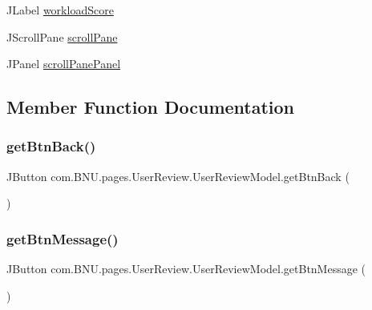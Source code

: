 \begin{DoxyCompactItemize}
\item 
J\+Label \mbox{\hyperlink{classcom_1_1_b_n_u_1_1pages_1_1_user_review_1_1_user_review_model_ab3c079414ba5b6f4f833951fbd028f17}{workload\+Score}}
\item 
J\+Scroll\+Pane \mbox{\hyperlink{classcom_1_1_b_n_u_1_1pages_1_1_user_review_1_1_user_review_model_ac28ee8d9092962f024e60bd57b8f02a5}{scroll\+Pane}}
\item 
J\+Panel \mbox{\hyperlink{classcom_1_1_b_n_u_1_1pages_1_1_user_review_1_1_user_review_model_aa739148e3686221309cc120149f7300d}{scroll\+Pane\+Panel}}
\end{DoxyCompactItemize}


\subsection{Member Function Documentation}
\mbox{\label{classcom_1_1_b_n_u_1_1pages_1_1_user_review_1_1_user_review_model_a686f5cc71adf786ac6cd8d8d5b3a7bb9}} 
\subsubsection{\texorpdfstring{get\+Btn\+Back()}{getBtnBack()}}
{\footnotesize\ttfamily J\+Button com.\+B\+N\+U.\+pages.\+User\+Review.\+User\+Review\+Model.\+get\+Btn\+Back (\begin{DoxyParamCaption}{ }\end{DoxyParamCaption})}

\mbox{\label{classcom_1_1_b_n_u_1_1pages_1_1_user_review_1_1_user_review_model_ab47b5dd798e9c374095e74b0588690fb}} 
\subsubsection{\texorpdfstring{get\+Btn\+Message()}{getBtnMessage()}}
{\footnotesize\ttfamily J\+Button com.\+B\+N\+U.\+pages.\+User\+Review.\+User\+Review\+Model.\+get\+Btn\+Message (\begin{DoxyParamCaption}{ }\end{DoxyParamCaption})}

